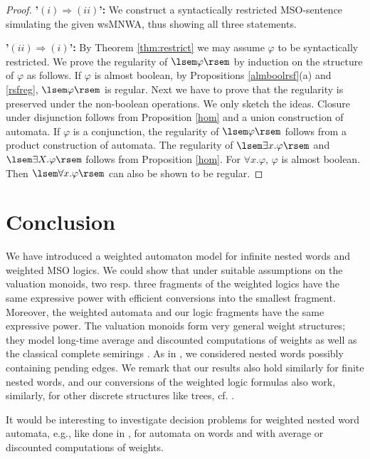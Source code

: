 \documentclass[runningheads, envcountsame, a4paper]{llncs}
\begin{document}
\begin{proof}
\par 
\textbf{'$(i) \Rightarrow (ii)$':} We construct a syntactically restricted MSO-sentence simulating the given wsMNWA, thus showing all three statements. 
\par
\textbf{'$(ii) \Rightarrow (i)$':} By Theorem \ref{thm:restrict} we may assume $\varphi$ to be syntactically restricted. We prove the regularity of $\lsem \varphi \rsem$ by induction on the structure of $\varphi$ as follows.
If $\varphi$ is almost boolean, by Propositions \ref{almboolrsf}(a) and \ref{rsfreg}, $\lsem \varphi \rsem$ is regular. Next we have to prove that the regularity is preserved under the non-boolean operations.
We only sketch the ideas. Closure under disjunction follows from Proposition \ref{hom} and a union construction of automata. If $\varphi$ is a conjunction, the regularity of $\lsem \varphi \rsem$ 
follows from a product construction of automata. The regularity of $\lsem \exists x. \varphi\rsem$ and $\lsem \exists X. \varphi \rsem$ follows from Proposition \ref{hom}. For $\forall x. \varphi$, $\varphi$ is almost boolean. Then $\lsem \forall x.\varphi \rsem$ can also be shown to be regular. \end{proof} 

	\section{Conclusion} 
We have introduced a weighted automaton model for infinite nested
words and weighted MSO logics. We could show that under suitable
assumptions on the valuation monoids, two resp. three fragments of the weighted logics have the same
expressive power with efficient conversions into the smallest
fragment. Moreover, the weighted automata and our logic fragments
have the same expressive power. The valuation monoids
form very general weight structures; they model
long-time average and discounted computations of weights as well
as the classical complete semirings \cite{DG}. As in \cite{AM}, we considered
nested words possibly containing pending edges. We remark that
our results also hold similarly for finite nested words, and our conversions of the weighted logic formulas also work, similarly, for other discrete structures like trees, cf. \cite{DGMM}. 

It would be interesting to investigate decision problems for
weighted nested word automata, e.g., like done in \cite{CDH}, \cite{CDH2} 
for automata on words and with average or discounted computations
of weights.{}

\end{document}
